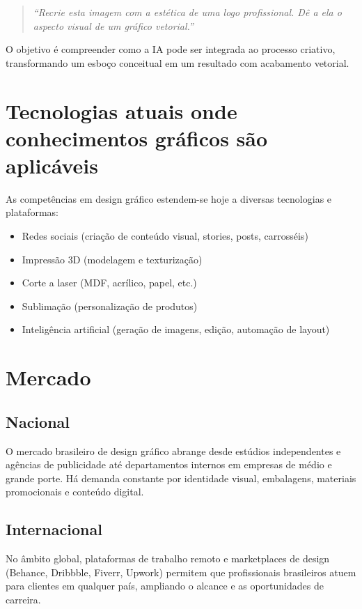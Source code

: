 \documentclass[a4paper,12pt]{article}
\begin{document}
\begin{quote}
\textit{``Recrie esta imagem com a estética de uma logo profissional. Dê a ela o aspecto visual de um gráfico vetorial.''}
\end{quote}

\noindent O objetivo é compreender como a IA pode ser integrada ao processo criativo, transformando um esboço conceitual em um resultado com acabamento vetorial.

\section{Tecnologias atuais onde conhecimentos gráficos são aplicáveis}

As competências em design gráfico estendem-se hoje a diversas tecnologias e plataformas:

\begin{itemize}[nosep]
  \item Redes sociais (criação de conteúdo visual, stories, posts, carrosséis)
  \item Impressão 3D (modelagem e texturização)
  \item Corte a laser (MDF, acrílico, papel, etc.)
  \item Sublimação (personalização de produtos)
  \item Inteligência artificial (geração de imagens, edição, automação de layout)
\end{itemize}

\section{Mercado}

\subsection*{Nacional}
O mercado brasileiro de design gráfico abrange desde estúdios independentes e agências de publicidade até departamentos internos em empresas de médio e grande porte. Há demanda constante por identidade visual, embalagens, materiais promocionais e conteúdo digital.

\subsection*{Internacional}
No âmbito global, plataformas de trabalho remoto e marketplaces de design (Behance, Dribbble, Fiverr, Upwork) permitem que profissionais brasileiros atuem para clientes em qualquer país, ampliando o alcance e as oportunidades de carreira.
\end{document}
